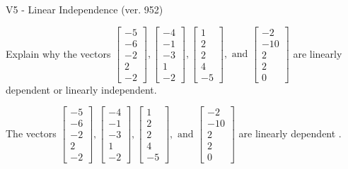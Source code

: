 \begin{exercise}
  \begin{exerciseTitle}V5 - Linear Independence (ver. 952)\end{exerciseTitle}
  \begin{exerciseStatement}
    Explain why the vectors \(\left[\begin{array}{r}
-5 \\
-6 \\
-2 \\
2 \\
-2
\end{array}\right] , \left[\begin{array}{r}
-4 \\
-1 \\
-3 \\
1 \\
-2
\end{array}\right] , \left[\begin{array}{r}
1 \\
2 \\
2 \\
4 \\
-5
\end{array}\right] , \text{ and } \left[\begin{array}{r}
-2 \\
-10 \\
2 \\
2 \\
0
\end{array}\right]\) are linearly dependent or linearly independent.	


  \end{exerciseStatement}
  \begin{exerciseAnswer}
   The vectors \(\left[\begin{array}{r}
-5 \\
-6 \\
-2 \\
2 \\
-2
\end{array}\right] , \left[\begin{array}{r}
-4 \\
-1 \\
-3 \\
1 \\
-2
\end{array}\right] , \left[\begin{array}{r}
1 \\
2 \\
2 \\
4 \\
-5
\end{array}\right] , \text{ and } \left[\begin{array}{r}
-2 \\
-10 \\
2 \\
2 \\
0
\end{array}\right]\) are 
  	 linearly dependent  .
  


  \end{exerciseAnswer}
\end{exercise}
